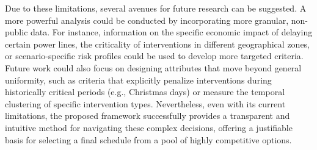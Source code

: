 Due to these limitations, several avenues for future research can be suggested. A more powerful analysis could be conducted by incorporating more granular, non-public data. For instance, information on the specific economic impact of delaying certain power lines, the criticality of interventions in different geographical zones, or scenario-specific risk profiles could be used to develop more targeted criteria. Future work could also focus on designing attributes that move beyond general uniformity, such as criteria that explicitly penalize interventions during historically critical periods (e.g., Christmas days) or measure the temporal clustering of specific intervention types. Nevertheless, even with its current limitations, the proposed framework successfully provides a transparent and intuitive method for navigating these complex decisions, offering a justifiable basis for selecting a final schedule from a pool of highly competitive options.